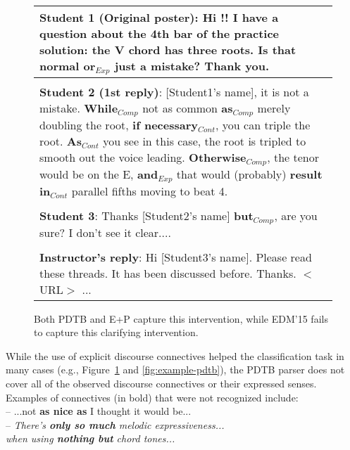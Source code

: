 \documentclass[letterpaper]{article}
\begin{document}
\begin{figure}[h]
\small 
\begin{tabular}{|p{7.8cm}|}
\hline 

\textbf{Student 1 (Original poster)}:
Hi !!  I have a question about the 4th bar of the practice solution:
the V chord has three roots. Is that normal \textbf{or}$_{Exp}$ just a mistake?
Thank you. \\

\hline \\

\textbf{Student 2 (1st reply)}:
[Student1's name], it is not a mistake. \textbf{While}$_{Comp}$ not
as common \textbf{as}$_{Comp}$ merely doubling the root,
\textbf{if necessary}$_{Cont}$, you can triple the root. \textbf{As}$_{Cont}$
you see in this case, the root is tripled to smooth out the voice leading.
\textbf{Otherwise}$_{Comp}$, the tenor would be on the E, \textbf{and}$_{Exp}$
that would (probably) \textbf{result in}$_{Cont}$ parallel fifths moving to beat 4. \\

\hline \\

\textbf{Student 3}: Thanks [Student2's name] \textbf{but}$_{Comp}$, are you sure?
I don't see it clear.... \\

\hline \\

\textbf{Instructor's reply}: Hi [Student3's name]. Please read these threads. 
It has been discussed before. 
Thanks. $<$URL$>$ ... \\

\hline
\end{tabular}
\caption{Both PDTB and E+P capture this intervention, while 
EDM'15 fails to capture this clarifying intervention.}
\label{fig:example-pdtbEDM}
\end{figure}

While the use of explicit discourse connectives helped the classification 
task in many cases (e.g., Figure~\ref{fig:example-pdtbEDM} and 
\ref{fig:example-pdtb}), the PDTB parser does not cover all of 
the observed discourse connectives or their expressed senses. Examples of 
connectives (in bold) that were not recognized include:\\

\indent -- ...not \textbf{as nice as} I thought it would be... \\
\indent -- \textit{ There's \textbf{only so much} melodic expressiveness...\\ 
\indent \hspace{3mm} when using \textbf{nothing but} chord tones...}\\
\end{document}
